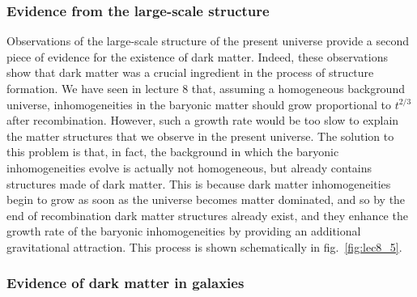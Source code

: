 \subsubsection{Evidence from the large-scale structure}

Observations of the large-scale structure of the present universe provide a second piece of evidence for the existence of dark matter. Indeed, these observations show that dark matter was a crucial ingredient in the process of structure formation. We have seen in lecture 8 that, assuming a homogeneous background universe, inhomogeneities in the baryonic matter should grow proportional to $t^{2/3}$ after recombination. However, such a growth rate would be too slow to explain the matter structures that we observe in the present universe. The solution to this problem is that, in fact, the background in which the baryonic inhomogeneities evolve is actually not homogeneous, but already contains structures made of dark matter. This is because dark matter inhomogeneities begin to grow as soon as the universe becomes matter dominated, and so by the end of recombination dark matter structures already exist, and they enhance the growth rate of the baryonic inhomogeneities by providing an additional gravitational 
attraction. This process is shown schematically in fig.\ \ref{fig:lec8_5}.

\subsubsection{Evidence of dark matter in galaxies}

